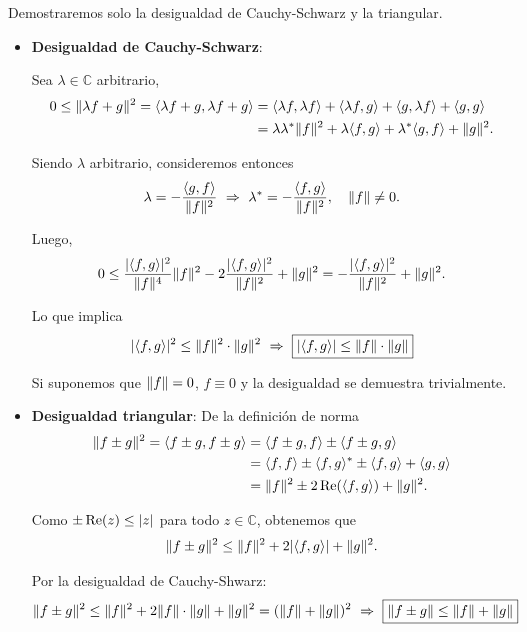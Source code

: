 \begin{demo}
Demostraremos solo la desigualdad de Cauchy-Schwarz y la triangular.

\begin{itemize}
    \item \textbf{Desigualdad de Cauchy-Schwarz}:
    
    Sea $\lambda \in \mathbb{C}$ arbitrario,
\begin{align*}
0 \leq \lVert\lambda f + g\rVert^2 = \langle \lambda f + g , \lambda f + g\rangle &= \langle \lambda f , \lambda f \rangle + \langle \lambda f , g \rangle + \langle g, \lambda f \rangle + \langle g , g \rangle \\
&= \lambda \lambda^* \lVert f\rVert^2 + \lambda \langle f,g\rangle + \lambda^* \langle g,f\rangle + \lVert g\rVert^2.
\end{align*}

Siendo $\lambda$ arbitrario, consideremos entonces
\begin{equation*}
    \lambda = - \frac{\langle g,f \rangle}{\lVert f\rVert^2} ~\Rightarrow~ \lambda^* = - \frac{\langle f,g\rangle}{\lVert f\rVert^2}, \quad \lVert f\rVert \neq 0.
\end{equation*}

Luego, 
$$0 \leq \frac{|\langle f, g \rangle|^2}{\lVert f\rVert^4} \lVert f\rVert^2 - 2 \frac{|\langle f,g \rangle|^2}{\lVert f\rVert^2} + \lVert g\rVert^2 = -\frac{|\langle f,g \rangle|^2}{\lVert f\rVert^2} + \lVert g\rVert^2. $$

Lo que implica 
$$|\langle f,g \rangle|^2 \leq \lVert f\rVert^2 \cdot \lVert g\rVert^2 ~\Rightarrow~ \boxed{|\langle f , g \rangle| \leq \lVert f\rVert \cdot \lVert g\rVert}$$

Si suponemos que $\lVert f\rVert = 0$, $f \equiv 0$ y la desigualdad se demuestra trivialmente.

 \item \textbf{Desigualdad triangular}: De la definición de norma
 \begin{align*}
     \lVert f\pm g\rVert^2 = \langle  f \pm g , f \pm g \rangle &= \langle f \pm g , f \rangle \pm \langle f \pm g , g\rangle \\
     &= \langle f,f \rangle \pm \langle f , g \rangle^* \pm \langle f,g \rangle +  \langle g,g \rangle \\
     &= \lVert f\rVert^2 \pm 2 \operatorname{Re}(\langle f,g \rangle) + \lVert g\rVert^2.
 \end{align*}
 
 Como $\pm \operatorname{Re}(z) \leq |z|$ para todo $z \in \mathbb{C}$, obtenemos que 
 $$\lVert f\pm g\rVert^2 \leq \lVert f\rVert^2+ 2 |\langle f,g \rangle| + \lVert g\rVert^2.$$
 
 Por la desigualdad de  Cauchy-Shwarz:
 $$\lVert f\pm g\rVert^2 \leq \lVert f\rVert^2 + 2 \lVert f\rVert \cdot \lVert g\rVert + \lVert g\rVert^2 = (\lVert f\rVert + \lVert g\rVert)^2 ~\Rightarrow~ \boxed{\lVert f \pm g\rVert \leq \lVert f\rVert + \lVert g\rVert}$$
\end{itemize}


\end{demo}

